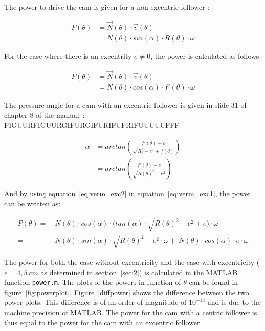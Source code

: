 \documentclass[a4paper]{article}
\begin{document}
The power to drive the cam is given for a non-excentric follower \cite{vermogen}:

\begin{equation}
	\begin{split}
	P(\theta) & = \vec{N}(\theta)\cdot\vec{v}(\theta) \\
	&=N(\theta)\cdot sin(\alpha)\cdot R(\theta)\cdot \omega
	\end{split}
\end{equation}

For the case where there is an excentrity \(e\neq0\), the power is calculated as follows:

\begin{equation}
	\begin{split}
	P(\theta) & = \vec{N}(\theta)\cdot\vec{v}(\theta) \\
	&=N(\theta)\cdot cos(\alpha)\cdot f'(\theta)\cdot\omega
	\end{split}
	\label{eq:verm_exc1}
\end{equation}

The pressure angle for a cam with an excentric follower is given in slide 31 of chapter 8 of the manual~\cite{cursus}: FIGUURFIGUURGIFURGIFURIFUFRIFUUUUUFFF

\begin{equation}
	\begin{split}
	\alpha& = arctan\left(\frac{f'(\theta)-e}{\sqrt{R_0^2-e^2}+f(\theta)}\right)\\
	&=arctan\left(\frac{f'(\theta)-e}{\sqrt{R(\theta)^2-e^2}}\right)
	\end{split}
	\label{eq:verm_exc2}
\end{equation}

And by using equation~\ref{eq:verm_exc2} in equation~\ref{eq:verm_exc1}, the power can be written as:

\begin{equation}
	\begin{split}
	P(\theta) =&~ N(\theta)\cdot cos(\alpha)\cdot \Big(tan(\alpha)\cdot\sqrt{R(\theta)^2-e^2}+e\Big)\cdot\omega\\
	=&~N(\theta)\cdot sin(\alpha)\cdot\sqrt{R(\theta)^2-e^2}\cdot\omega  +~N(\theta)\cdot cos(\alpha)\cdot e \cdot\omega
	\end{split}
\end{equation}

The power for both the case without excentricity and the case with excentricity (\(e=4,5~cm\) as determined in section~\ref{sec:2}) is calculated in the MATLAB function \texttt{power.m}. The plots of the powers in function of \(\theta\) can be found in figure~\ref{fig:powerplot}. Figure~\ref{diffpower} shows the difference between the two power plots. This difference is of an order of magnitude of \(10^{-14}\) and is due to the machine precision of MATLAB. The power for the cam with a centric follower is thus equal to the power for the cam with an excentric follower.
\end{document}
